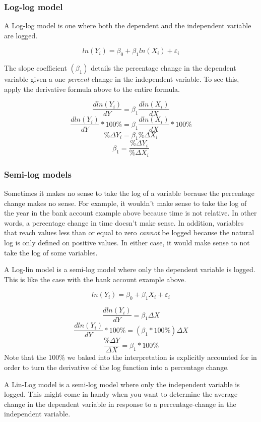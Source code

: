 \documentclass[
]{book}
\begin{document}
\subsubsection*{Log-log model}\label{log-log-model}

A Log-log model is one where both the dependent and the independent variable are logged.

\[ln(Y_i)=\beta_0 + \beta_1 ln(X_i) + \varepsilon_i\]

The slope coefficient \((\beta_1)\) details the percentage change in the dependent variable given a one \emph{percent} change in the independent variable. To see this, apply the derivative formula above to the entire formula.

\[\frac{dln(Y_i)}{dY} = \beta_1 \frac{dln(X_i)}{dX}\]
\[\frac{dln(Y_i)}{dY} * 100\% = \beta_1 \frac{dln(X_i)}{dX} * 100\%\]
\[\%\Delta Y_i = \beta_1 \%\Delta X_i\]
\[ \beta_1 =\frac{\%\Delta Y_i}{\%\Delta X_i}\]

\subsubsection*{Semi-log models}\label{semi-log-models}

Sometimes it makes no sense to take the log of a variable because the percentage change makes no sense. For example, it wouldn't make sense to take the log of the year in the bank account example above because time is not relative. In other words, a percentage change in time doesn't make sense. In addition, variables that reach values less than or equal to zero \emph{cannot} be logged because the natural log is only defined on positive values. In either case, it would make sense to not take the log of some variables.

A Log-lin model is a semi-log model where only the dependent variable is logged. This is like the case with the bank account example above.

\[ln(Y_i)=\beta_0 + \beta_1 X_i + \varepsilon_i\]

\[\frac{dln(Y_i)}{dY} = \beta_1 \Delta X\]
\[\frac{dln(Y_i)}{dY} * 100\% = (\beta_1 * 100\%)\Delta X\]
\[\frac{\% \Delta Y}{\Delta X}= \beta_1 * 100\%\]
Note that the \(100\%\) we baked into the interpretation is explicitly accounted for in order to turn the derivative of the log function into a percentage change.

A Lin-Log model is a semi-log model where only the independent variable is logged. This might come in handy when you want to determine the average change in the dependent variable in response to a percentage-change in the independent variable.
\end{document}
